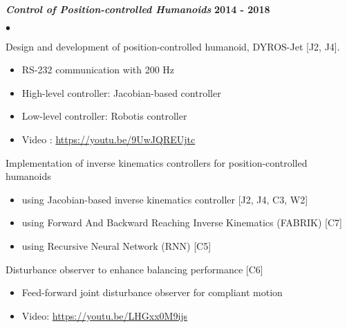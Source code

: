 \documentclass[margin,line]{res}
\newenvironment{list2}{
  \begin{list}{$\bullet$}{%
      \setlength{\itemsep}{0in}
      \setlength{\parsep}{0in} \setlength{\parskip}{0in}
      \setlength{\topsep}{0in} \setlength{\partopsep}{0in} 
      \setlength{\leftmargin}{0.2in}}}{\end{list}}
\begin{document}
\begin{resume}
  \textbf{\emph { Control of Position-controlled Humanoids}} \hfill {\bf 2014  - 2018}
  \begin{list2}
    \item Design and development of position-controlled humanoid, DYROS-Jet [J2, J4].
    \begin{itemize}
      \vspace*{-.05in}
      \item[\checkmark] RS-232 communication with 200 Hz
            \vspace*{-.05in}
      \item[\checkmark] High-level controller: Jacobian-based controller
            \vspace*{-.05in}
      \item[\checkmark] Low-level controller: Robotis controller
            \vspace*{-.05in}
      \item[\checkmark] Video : \url{https://youtu.be/9UwJQREUjtc}
            \vspace*{-.05in}
    \end{itemize}
    \item Implementation of inverse kinematics controllers for position-controlled humanoids
    \begin{itemize}
      \vspace*{-.05in}
      \item[\checkmark] using Jacobian-based inverse kinematics controller [J2, J4, C3, W2]
            \vspace*{-.05in}
      \item[\checkmark] using Forward And Backward Reaching Inverse Kinematics (FABRIK) [C7]
            \vspace*{-.05in}
      \item[\checkmark] using Recursive Neural Network (RNN) [C5]
            \vspace*{-.05in}
    \end{itemize}
    \item Disturbance observer to enhance balancing performance [C6]
    \begin{itemize}
      \vspace*{-.05in}
      \item[\checkmark] Feed-forward joint disturbance observer for compliant motion
            \vspace*{-.05in}
      \item[\checkmark] Video:  \url{https://youtu.be/LHGxx0M9ijs}
            \vspace*{-.05in}
    \end{itemize}
  \end{list2}



\end{resume}
\end{document}
